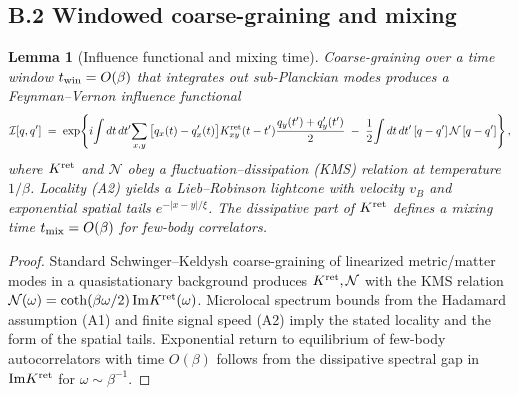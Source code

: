 \documentclass[a4paper,11pt]{article}
\theoremstyle{plain}
\newtheorem{lemma}{Lemma}
\theoremstyle{definition}
\theoremstyle{remark}
\begin{document}
\subsection*{B.2 Windowed coarse-graining and mixing}
\begin{lemma}[Influence functional and mixing time]
\label{lem:IF}
Coarse-graining over a time window $t_{\rm win}=O(\beta)$ that integrates out sub-Planckian modes produces a Feynman--Vernon influence functional
\[
\mathcal{I}[q,q'] \;=\; \exp\!\left\{ i\!\int dt\,dt'\!\sum_{x,y}\big[q_x(t)-q'_x(t)\big]K^{\rm ret}_{xy}(t-t')\frac{q_y(t')+q'_y(t')}{2}\;-\;\frac{1}{2}\!\int dt\,dt'\,[q-q']\,\mathcal{N}\,[q-q']\right\},
\]
where $K^{\rm ret}$ and $\mathcal{N}$ obey a fluctuation--dissipation (KMS) relation at temperature $1/\beta$.
Locality (A2) yields a Lieb--Robinson lightcone with velocity $v_B$ and exponential spatial tails $e^{-|x-y|/\xi}$.
The dissipative part of $K^{\rm ret}$ defines a mixing time $t_{\rm mix}=O(\beta)$ for few-body correlators.
\end{lemma}
\begin{proof}
Standard Schwinger--Keldysh coarse-graining of linearized metric/matter modes in a quasistationary background produces $K^{\rm ret},\mathcal{N}$ with the KMS relation $\mathcal{N}(\omega)=\coth(\beta\omega/2)\,\mathrm{Im}K^{\rm ret}(\omega)$.
Microlocal spectrum bounds from the Hadamard assumption (A1) and finite signal speed (A2) imply the stated locality and the form of the spatial tails.
Exponential return to equilibrium of few-body autocorrelators with time $O(\beta)$ follows from the dissipative spectral gap in $\mathrm{Im}K^{\rm ret}$ for $\omega\sim \beta^{-1}$.
\end{proof}
\end{document}
